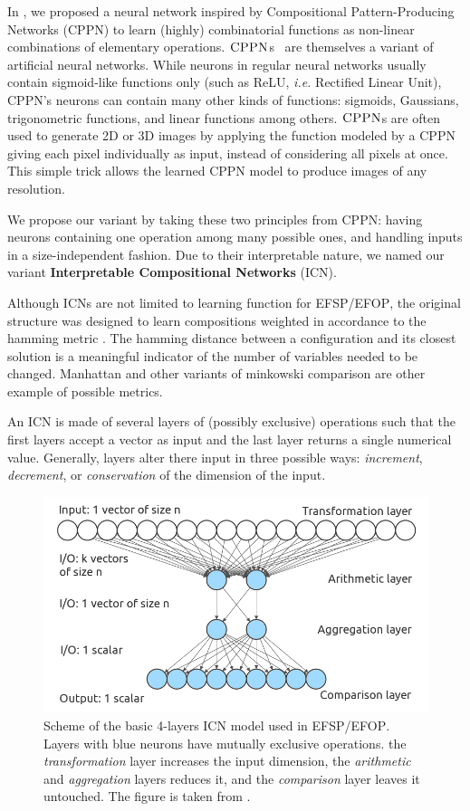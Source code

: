 \documentclass{juliacon}
\newcommand{\ie}{\emph{i.e.}}
\newcommand{\efsp}{\textsc{EFSP}\xspace}
\newcommand{\efop}{\textsc{EFOP}\xspace}
\newcommand{\cppn}{\textsc{CPPN}\xspace}
\newcommand{\icn}{\textsc{ICN}\xspace}
\begin{document}
In \cite{richoux2020automatic}, we proposed a neural network inspired by Compositional Pattern-Producing Networks (\cppn) to learn (highly) combinatorial functions as non-linear combinations of elementary operations. \(\cppn\)s~\cite{stanley2007cppn} are themselves a variant of artificial neural networks. While neurons in regular neural networks usually  contain sigmoid-like functions only (such  as ReLU, \ie{} Rectified Linear  Unit), \cppn's neurons can contain many other kinds of functions: sigmoids, Gaussians, trigonometric functions, and linear functions among others.
\(\cppn\)s are often used to generate 2D or 3D images by applying the function modeled by a \cppn giving each pixel individually as input, instead of considering all pixels at once. This simple trick allows the learned \cppn model to produce images of any resolution.

We propose our variant by taking these two principles from \cppn: having neurons containing one operation among many possible ones, and handling inputs in a size-independent fashion. Due to their interpretable nature, we named our variant \textbf{Interpretable Compositional Networks} (\icn).

Although ICNs are not limited to learning function for \efsp/\efop, the original structure was designed to learn compositions weighted in accordance to the hamming metric \cite{richoux2020automatic}. The hamming distance between a configuration and its closest solution is a meaningful indicator of the number of variables needed to be changed. Manhattan and other variants of minkowski comparison are other example of possible metrics.

An ICN is made of several layers of (possibly exclusive) operations such that the first layers accept a vector as input and the last layer returns a single numerical value. Generally, layers alter there input in three possible ways: \emph{increment}, \emph{decrement}, or \emph{conservation} of the dimension of the input.

\begin{figure}[t]
  \centerline{\includegraphics[width=\columnwidth]{figs/model_nn.png}}
  \caption{Scheme of the basic 4-layers ICN model used in \efsp/\efop. Layers with blue neurons have mutually exclusive operations. the \emph{transformation} layer increases the input dimension, the \emph{arithmetic} and \emph{aggregation} layers reduces it, and the \emph{comparison} layer leaves it untouched. The figure is taken from \cite{richoux2020automatic}.}
  \label{fig:model_icn}
\end{figure}
\end{document}
